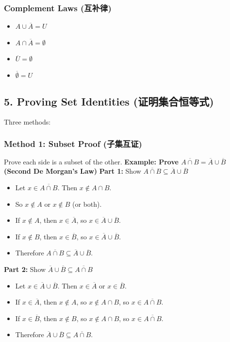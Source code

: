 \documentclass[10pt,a4paper,openany]{ctexbook}
\theoremstyle{definition}
\theoremstyle{remark}
\begin{document}
\subsubsection{Complement Laws (互补律)}

\begin{itemize}
\item $A \cup \overline{A} = U$
\item $A \cap \overline{A} = \emptyset$
\item $\overline{U} = \emptyset$
\item $\overline{\emptyset} = U$

\end{itemize}

\vspace{-2pt}

\subsection{5. Proving Set Identities (证明集合恒等式)}

Three methods:
\subsubsection{Method 1: Subset Proof (子集互证)}

Prove each side is a subset of the other.
\textbf{Example: Prove $\overline{A \cap B} = \overline{A} \cup \overline{B}$ (Second De Morgan's Law)}
\textbf{Part 1:} Show $\overline{A \cap B} \subseteq \overline{A} \cup \overline{B}$
\begin{itemize}
\item Let $x \in \overline{A \cap B}$. Then $x \notin A \cap B$.
\item So $x \notin A$ or $x \notin B$ (or both).
\item If $x \notin A$, then $x \in \overline{A}$, so $x \in \overline{A} \cup \overline{B}$.
\item If $x \notin B$, then $x \in \overline{B}$, so $x \in \overline{A} \cup \overline{B}$.
\item Therefore $\overline{A \cap B} \subseteq \overline{A} \cup \overline{B}$.

\end{itemize}

\textbf{Part 2:} Show $\overline{A} \cup \overline{B} \subseteq \overline{A \cap B}$
\begin{itemize}
\item Let $x \in \overline{A} \cup \overline{B}$. Then $x \in \overline{A}$ or $x \in \overline{B}$.
\item If $x \in \overline{A}$, then $x \notin A$, so $x \notin A \cap B$, so $x \in \overline{A \cap B}$.
\item If $x \in \overline{B}$, then $x \notin B$, so $x \notin A \cap B$, so $x \in \overline{A \cap B}$.
\item Therefore $\overline{A} \cup \overline{B} \subseteq \overline{A \cap B}$.

\end{itemize}
\end{document}
